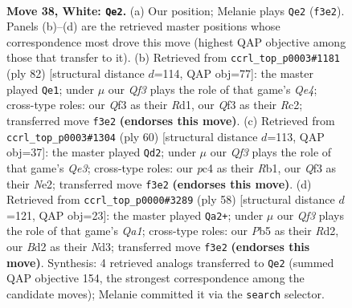 \documentclass[11pt]{article}
\begin{document}
\clearpage

\begin{figure}[p]\centering
\begin{subfigure}{0.46\textwidth}\centering
\resizebox{\linewidth}{!}{%
\newchessgame
\chessboard[
  setfen={r2q1rk1/3n4/3p4/1P2bp1p/p1p3nP/P4QP1/R1NB4/1N1R2K1 w - - 0 38},
  showmover=false,
  pgfstyle=straightmove, color=movearrow, markmove={f3-e2}
]}
\caption{}
\end{subfigure}\hfill
\begin{subfigure}{0.46\textwidth}\centering
\resizebox{\linewidth}{!}{%
\newchessgame
\chessboard[
  setfen={6k1/2r1qr1p/2pbp1pP/pp1n4/4Q1N1/1P4P1/2R2PB1/3R2K1 w - - 0 42},
  showmover=false,
  pgfstyle=straightmove, color=movearrow, markmove={e4-e1}
]}
\caption{}
\end{subfigure}
\\[4pt]
\begin{subfigure}{0.46\textwidth}\centering
\resizebox{\linewidth}{!}{%
\newchessgame
\chessboard[
  setfen={1r1qr1k1/5p2/3pb2p/4p1p1/1P2Pn2/4QP2/2N1N1PP/1R1R3K w - - 5 31},
  showmover=false,
  pgfstyle=straightmove, color=movearrow, markmove={e3-d2}
]}
\caption{}
\end{subfigure}\hfill
\begin{subfigure}{0.46\textwidth}\centering
\resizebox{\linewidth}{!}{%
\newchessgame
\chessboard[
  setfen={3rb1k1/r6p/pp1q4/1n4pB/1P1p4/3N2P1/3RPP1P/Q1R3K1 w - - 2 30},
  showmover=false,
  pgfstyle=straightmove, color=movearrow, markmove={a1-a2}
]}
\caption{}
\end{subfigure}
\caption{\textbf{Move 38, White: \texttt{Qe2}.} (a) Our position; Melanie plays \texttt{Qe2} (\texttt{f3e2}). Panels (b)--(d) are the retrieved master positions whose correspondence most drove this move (highest QAP objective among those that transfer to it). (b) Retrieved from \texttt{ccrl\_top\_p0003\#1181} (ply 82) [structural distance $d$=114, QAP obj=77]: the master played \texttt{Qe1}; under $\mu$ our \emph{Qf3} plays the role of that game's \emph{Qe4}; cross-type roles: our \emph{Q}f3 as their \emph{R}d1, our \emph{Q}f3 as their \emph{R}c2; transferred move \texttt{f3e2} \textbf{(endorses this move)}. (c) Retrieved from \texttt{ccrl\_top\_p0003\#1304} (ply 60) [structural distance $d$=113, QAP obj=37]: the master played \texttt{Qd2}; under $\mu$ our \emph{Qf3} plays the role of that game's \emph{Qe3}; cross-type roles: our \emph{p}c4 as their \emph{R}b1, our \emph{Q}f3 as their \emph{N}e2; transferred move \texttt{f3e2} \textbf{(endorses this move)}. (d) Retrieved from \texttt{ccrl\_top\_p0000\#3289} (ply 58) [structural distance $d$=121, QAP obj=23]: the master played \texttt{Qa2+}; under $\mu$ our \emph{Qf3} plays the role of that game's \emph{Qa1}; cross-type roles: our \emph{P}b5 as their \emph{R}d2, our \emph{B}d2 as their \emph{N}d3; transferred move \texttt{f3e2} \textbf{(endorses this move)}. Synthesis: 4 retrieved analogs transferred to \texttt{Qe2} (summed QAP objective 154, the strongest correspondence among the candidate moves); Melanie committed it via the \texttt{search} selector.}
\label{fig:thought-m74}
\end{figure}
\end{document}
